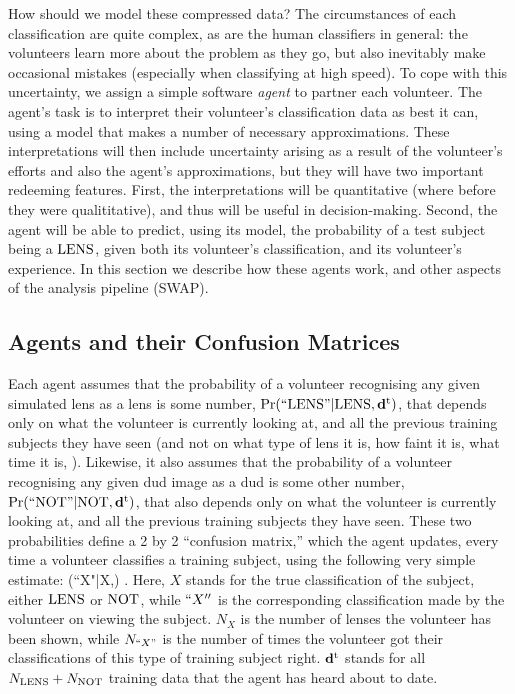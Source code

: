 \documentclass[useAMS,usenatbib,a4paper]{mn2e}
\begin{document}
How should we model these compressed data? The circumstances of each
classification are quite complex, as are the human classifiers in general: the
volunteers learn more about the problem as they go, but also inevitably make
occasional mistakes (especially when classifying at high speed).
To cope with this uncertainty, we assign a
simple software {\it agent} to partner each volunteer. The agent's task is to
interpret their volunteer's classification data as best it can, using a model
that makes a number of necessary approximations. These interpretations will
then include uncertainty arising as a result of the volunteer's efforts and
also the agent's approximations, but they will have two important redeeming
features. First, the interpretations will be quantitative (where before they
were qualititative),  and thus will be useful in decision-making. Second, the
agent will be able to predict, using its model, the probability of a test
subject being a ${\rm LENS}$, given both its volunteer's classification, and its
volunteer's experience. In this section we describe how these agents work,
and other aspects of the \SW analysis pipeline (SWAP).


\subsection{Agents and their Confusion Matrices}
\label{sec:swap:details:probabilities}

Each agent assumes that the probability of a volunteer recognising any given
simulated lens as a lens is some number, ${\rm Pr}({\rm ``LENS"}|{\rm LENS},{\mathbf{d}^{\rm t}})$, that
depends only on what the volunteer is currently looking at, and all the
previous training subjects they have seen (and not on what type of lens it is,
how faint it is, what time it is, \etc). Likewise, it also assumes that the
probability of a volunteer recognising any given dud image as a dud is some
other number, ${\rm Pr}({\rm ``NOT"}|{\rm NOT},{\mathbf{d}^{\rm t}})$, that also depends only on what the volunteer is currently looking at, and all the
previous training subjects they have seen. These two probabilities define a
2 by 2 ``confusion matrix,'' which the agent updates, every time a
volunteer classifies a training subject, using the following
very simple estimate:
\be
  \pr(``X"|X,\training) \approx {}.
  \label{eq:app:fraction}
\ee
Here, $X$ stands for the true classification of the subject, \ie either
${\rm LENS}$ or ${\rm NOT}$, while $``X''$ is the corresponding classification
made by the volunteer on viewing the subject. $N_X$ is the number of
lenses the volunteer has been shown, while $N_{``X"}$ is the number of
times the volunteer got their classifications of this type of training subject
right. ${\mathbf{d}^{\rm t}}$ stands for all
$N_{{\rm LENS}} + N_{{\rm NOT}}$ training data that the agent has heard about to
date.
\end{document}
